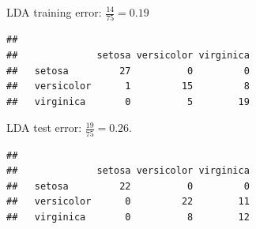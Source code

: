 \documentclass[
  10pt,
  ignorenonframetext,
]{beamer}
\newenvironment{Shaded}{\begin{snugshade}}{\end{snugshade}}
\newcommand{\AttributeTok}[1]{\textcolor[rgb]{0.13,0.29,0.53}{#1}}
\newcommand{\FunctionTok}[1]{\textcolor[rgb]{0.13,0.29,0.53}{\textbf{#1}}}
\newcommand{\NormalTok}[1]{#1}
\newcommand{\OtherTok}[1]{\textcolor[rgb]{0.56,0.35,0.01}{#1}}
\newcommand{\SpecialCharTok}[1]{\textcolor[rgb]{0.81,0.36,0.00}{\textbf{#1}}}
\begin{document}
\begin{frame}[fragile]
LDA training error: \(\frac{14}{75} =0.19\)

\scriptsize

\begin{Shaded}
\end{Shaded}

\begin{verbatim}
##             
##              setosa versicolor virginica
##   setosa         27          0         0
##   versicolor      1         15         8
##   virginica       0          5        19
\end{verbatim}

\normalsize

\vspace{2mm}

LDA test error: \(\frac{19}{75} =0.26.\)

\scriptsize

\begin{Shaded}
\end{Shaded}

\begin{verbatim}
##             
##              setosa versicolor virginica
##   setosa         22          0         0
##   versicolor      0         22        11
##   virginica       0          8        12
\end{verbatim}
\end{frame}
\end{document}
